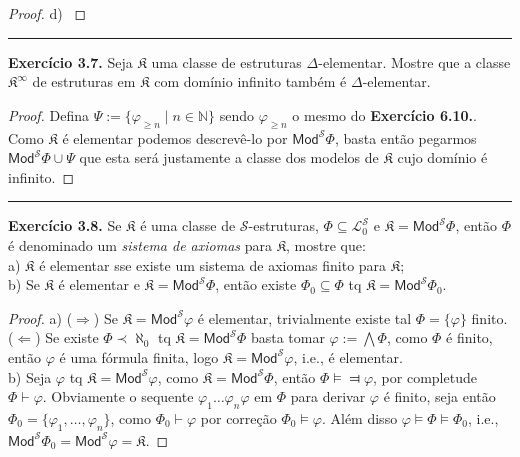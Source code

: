 \documentclass[11pt]{article}
\theoremstyle{definition}
\newcommand{\mc}[1]{\mathcal{#1}}
\newcommand{\mf}[1]{\mathfrak{#1}}
\newcommand{\msf}[1]{\mathsf{#1}}
\newcommand{\mbb}[1]{\mathbb{#1}}
\begin{document}
\begin{proof}
    d) \textbf{\color{red}{PENDENTE}}
\end{proof}

\hrule

\textbf{Exercício 3.7.} Seja $\mf{K}$ uma classe de estruturas $\Delta$-elementar. Mostre que a classe $\mf{K}^\infty$ de estruturas em $\mf{K}$ com domínio infinito também é $\Delta$-elementar.

\begin{proof}
    Defina $\Psi:=\{\varphi_{\ge n}\mid n\in\mbb{N}\}$ sendo $\varphi_{\ge n}$ o mesmo do \textbf{Exercício 6.10.}. Como $\mf{K}$ é elementar podemos descrevê-lo por $\msf{Mod}^\mc{S}\Phi$, basta então pegarmos $\msf{Mod}^\mc{S}\Phi\cup\Psi$ que esta será justamente a classe dos modelos de $\mf{K}$ cujo domínio é infinito.
\end{proof}

\hrule

\textbf{Exercício 3.8.} Se $\mf{K}$ é uma classe de $\mc{S}$-estruturas, $\Phi\subseteq\mc{L}^\mc{S}_0$ e $\mf{K}=\msf{Mod}^\mc{S}\Phi$, então $\Phi$ é denominado um \textit{sistema de axiomas} para $\mf{K}$, mostre que:\\
a) $\mf{K}$ é elementar sse existe um sistema de axiomas finito para $\mf{K}$;\\
b) Se $\mf{K}$ é elementar e $\mf{K}=\msf{Mod}^\mc{S}\Phi$, então existe $\Phi_0\subseteq\Phi$ tq $\mf{K}=\msf{Mod}^\mc{S}\Phi_0$.

\begin{proof}
    a) ($\Rightarrow$) Se $\mf{K}=\msf{Mod}^\mc{S}\varphi$ é elementar, trivialmente existe tal $\Phi=\{\varphi\}$ finito.\\
    ($\Leftarrow$) Se existe $\Phi\prec\aleph_0$ tq $\mf{K}=\msf{Mod}^\mc{S}\Phi$ basta tomar $\varphi:=\bigwedge\Phi$, como $\Phi$ é finito, então $\varphi$ é uma fórmula finita, logo $\mf{K}=\msf{Mod}^\mc{S}\varphi$, i.e., é elementar.\\
    b) Seja $\varphi$ tq $\mf{K}=\msf{Mod}^\mc{S}\varphi$, como $\mf{K}=\msf{Mod}^\mc{S}\Phi$, então $\Phi\vDash\Dashv\varphi$, por completude $\Phi\vdash\varphi$. Obviamente o sequente $\varphi_1\dots\varphi_n\varphi$ em $\Phi$ para derivar $\varphi$ é finito, seja então $\Phi_0=\{\varphi_1,\dots,\varphi_n\}$, como $\Phi_0\vdash\varphi$ por correção $\Phi_0\vDash\varphi$. Além disso $\varphi\vDash\Phi\vDash\Phi_0$, i.e., $\msf{Mod}^\mc{S}\Phi_0=\msf{Mod}^\mc{S}\varphi=\mf{K}$.
\end{proof}
\end{document}
